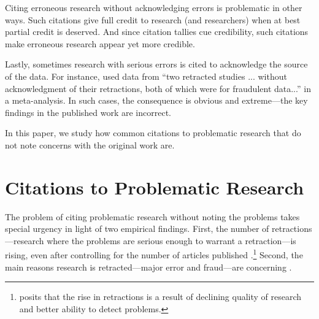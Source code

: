 \documentclass[12pt, letterpaper]{article}
\begin{document}
Citing erroneous research without acknowledging errors is problematic in other ways. Such citations give full credit to research (and researchers) when at best partial credit is deserved. And since citation tallies cue credibility, such citations make erroneous research appear yet more credible.

Lastly, sometimes research with serious errors is cited to acknowledge the source of the data. For instance, \citet{lin2013perioperative} used data from ``two retracted studies ... without acknowledgment of their retractions, both of which were for fraudulent data...'' \citep[p. 1,][]{paul2015comment} in a meta-analysis. In such cases, the consequence is obvious and extreme---the key findings in the published work are incorrect.

In this paper, we study how common citations to problematic research that do not note concerns with the original work are.

\section{Citations to Problematic Research}

The problem of citing problematic research without noting the problems takes special urgency in light of two empirical findings.  First, the number of retractions---research where the problems are serious enough to warrant a retraction---is rising, even after controlling for the number of articles published \citep{grieneisen2012comprehensive, steen2011retractions}.\footnote{\citet{steen2013has} posits that the rise in retractions is a result of declining quality of research and better ability to detect problems.} Second, the main reasons research is retracted---major error and fraud---are concerning \citep{bozzo2017retractions, grieneisen2012comprehensive,  singh2014comprehensive}.
\end{document}
